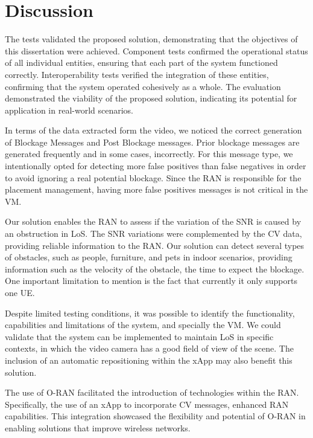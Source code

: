 \section{Discussion}\label{sec:discuss}
The tests validated the proposed solution, demonstrating that the objectives of this dissertation were achieved.
Component tests confirmed the operational status of all individual entities, ensuring that each part of the system functioned correctly.
Interoperability tests verified the integration of these entities, confirming that the system operated cohesively as a whole.
The evaluation demonstrated the viability of the proposed solution, indicating its potential for application in real-world scenarios.

In terms of the data extracted form the video, we noticed the correct generation of Blockage Messages and Post Blockage messages.
Prior blockage messages are generated frequently and in some cases, incorrectly.
For this message type, we intentionally opted for detecting more false positives than false negatives in order to avoid ignoring a real potential blockage.
Since the RAN is responsible for the placement management, having more false positives messages is not critical in the VM\@.

Our solution enables the RAN to assess if the variation of the SNR is caused by an obstruction in LoS\@.
The SNR variations were complemented by the CV data, providing reliable information to the RAN\@.
Our solution can detect several types of obstacles, such as people, furniture, and pets in indoor scenarios, providing information such as the velocity of the obstacle, the time to expect the blockage.
One important limitation to mention is the fact that currently it only supports one UE\@.

Despite limited testing conditions, it was possible to identify the functionality, capabilities and limitations of the system, and specially the VM\@.
We could validate that the system can be implemented to maintain LoS in specific contexts, in which the video camera has a good field of view of the scene.
The inclusion of an automatic repositioning within the xApp may also benefit this solution.

The use of O-RAN facilitated the introduction of technologies within the RAN\@.
Specifically, the use of an xApp to incorporate CV messages, enhanced RAN capabilities.
This integration showcased the flexibility and potential of O-RAN in enabling solutions that improve wireless networks.

